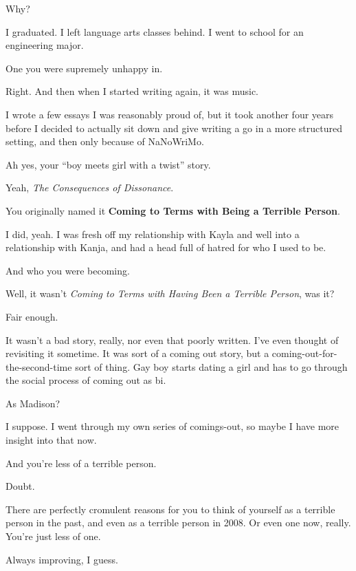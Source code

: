 \begin{paracol}{2}
\begin{leftcolumn}
\begin{ally}
Why?
\end{ally}
I graduated. I left language arts classes behind. I went to school for an engineering major.

\begin{ally}
One you were supremely unhappy in.
\end{ally}
Right. And then when I started writing again, it was music.

I wrote a few essays I was reasonably proud of, but it took another four years before I decided to actually sit down and give writing a go in a more structured setting, and then only because of NaNoWriMo.

\begin{ally}
Ah yes, your ``boy meets girl with a twist'' story.
\end{ally}
Yeah, \emph{The Consequences of Dissonance}.

\begin{ally}
You originally named it \textbf{Coming to Terms with Being a Terrible Person}.
\end{ally}
I did, yeah. I was fresh off my relationship with Kayla and well into a relationship with Kanja, and had a head full of hatred for who I used to be.

\begin{ally}
And who you were becoming.
\end{ally}
Well, it wasn't \emph{Coming to Terms with Having Been a Terrible Person}, was it?

\begin{ally}
Fair enough.
\end{ally}
It wasn't a bad story, really, nor even that poorly written. I've even thought of revisiting it sometime. It was sort of a coming out story, but a coming-out-for-the-second-time sort of thing. Gay boy starts dating a girl and has to go through the social process of coming out as bi.

\begin{ally}
As Madison?
\end{ally}
I suppose. I went through my own series of comings-out, so maybe I have more insight into that now.

\begin{ally}
And you're less of a terrible person.
\end{ally}
Doubt.

\begin{ally}
There are perfectly cromulent reasons for you to think of yourself as a terrible person in the past, and even as a terrible person in 2008. Or even one now, really. You're just less of one.
\end{ally}
Always improving, I guess.


\end{leftcolumn}
\end{paracol}
